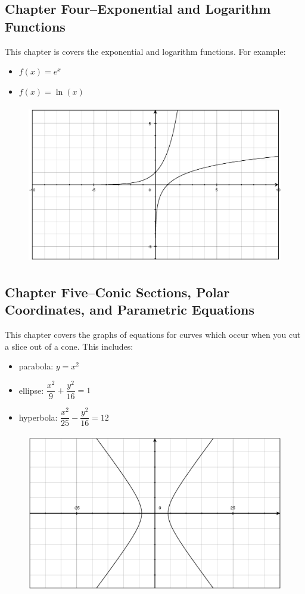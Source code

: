 \documentclass{article}
\begin{document}
\subsection{Chapter Four--Exponential and Logarithm Functions}
This chapter is covers the exponential and logarithm functions.  For example:
\begin{itemize}
  \item $f(x) = e^x$
  \item $f(x) = \ln(x)$
\end{itemize}

\begin{figure}[H]
  \includegraphics[width=12cm,height=7cm]{exponential}
\end{figure}

\subsection{Chapter Five--Conic Sections, Polar Coordinates, and Parametric Equations}
This chapter covers the graphs of equations for curves which occur when you cut a slice out of a cone.  This includes:
\begin{itemize}
  \item parabola: $y = x^2$
  \item ellipse: $\dfrac{x^2}{9} + \dfrac{y^2}{16} = 1$
  \item hyperbola: $\dfrac{x^2}{25} - \dfrac{y^2}{16} = 12$
\end{itemize}

\begin{figure}[H]
  \includegraphics[width=12cm,height=7cm]{conic}
\end{figure}
\end{document}
